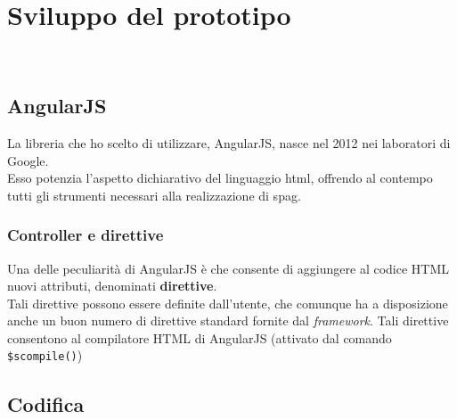 
\chapter{Sviluppo del prototipo}
\label{cap:sviluppo-prototipo}

\\

\section{AngularJS}
\label{sec:AngularJS}

La libreria che ho scelto di utilizzare, AngularJS, nasce nel 2012 nei laboratori di Google.\\
Esso potenzia l'aspetto dichiarativo del linguaggio \gls{html}, offrendo al contempo tutti gli strumenti necessari alla realizzazione di \gls{spag}. 
\subsection{Controller e direttive}
Una delle peculiarità di  AngularJS è che consente di aggiungere al codice HTML nuovi attributi, denominati \textbf{direttive}.\\
Tali direttive possono essere definite dall'utente, che comunque ha a disposizione anche un buon numero di 
direttive standard fornite dal \emph{framework}. Tali direttive consentono al compilatore HTML di AngularJS (attivato dal comando \lstinline{$scompile()})
\section{Codifica}





\newpage
